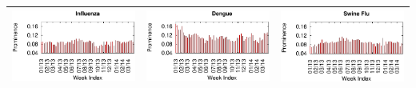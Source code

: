\documentclass[twoside,leqno,twocolumn]{article}
\begin{document}
\begin{table}[t]
\begin{tabular}{|lr|lr|lr|}
\multicolumn{2}{|c|}{\includegraphics[clip,scale=0.45]{fig/topic_influenza_timeline.eps}} & \multicolumn{2}{|c|}{\includegraphics[clip,scale=0.45]{fig/topic_dengue_timeline.eps}}& \multicolumn{2}{|c|}{\includegraphics[clip,scale=0.45]{fig/topic_swine_timeline.eps}} \\ \hline
\end{tabular}
\label{tab:topics_timelines}
\vspace{-10pt}
\end{table}
\end{document}
